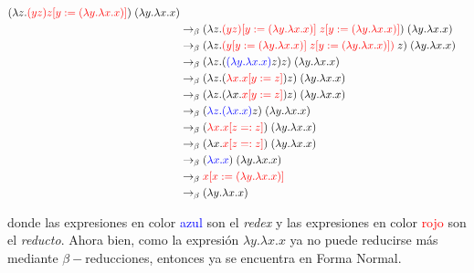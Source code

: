\documentclass[letterpaper,11pt]{article}
\begin{document}
\begin{enumerate}
\begin{enumerate}
\begin{align*}
            (\lambda z. \textcolor{red}{(yz)z [y := (\lambda y. \lambda x.x)]}) 
            \; (\lambda y. \lambda x.x) \\
            &\rightarrow_{\beta}
            (\lambda z. \textcolor{red}{(yz) [y := (\lambda y. \lambda x.x)] \; 
                                         z[y := (\lambda y. \lambda x.x)]}) 
            \; (\lambda y. \lambda x.x) \\
            &\rightarrow_{\beta} 
            (\lambda z. \textcolor{red}{(y [y := (\lambda y. \lambda x.x)] \; 
                                          z [y := (\lambda y. \lambda x.x)])} 
            \; z) \; 
            (\lambda y. \lambda x.x) \\ 
            &\rightarrow_{\beta}
            (\lambda z. (\textcolor{blue}{(\lambda y. \lambda x.x)} z)z) \; 
            (\lambda y. \lambda x.x) \\
            &\rightarrow_{\beta}
            (\lambda z. (\textcolor{red}{\lambda x.x [y := z]}) z) \; 
            (\lambda y. \lambda x.x) \\
            &\rightarrow_{\beta}
            (\lambda z. (\lambda x. \textcolor{red}{x [y := z]}) z) \; 
            (\lambda y. \lambda x.x) \\
            &\rightarrow_{\beta}
            (\textcolor{blue}{\lambda z. (\lambda x. x)} z) \; 
            (\lambda y. \lambda x.x) \\
            &\rightarrow_{\beta}
            (\textcolor{red}{\lambda x.x [z =: z]}) \; 
            (\lambda y. \lambda x.x) \\
            &\rightarrow_{\beta}
            (\lambda x. \textcolor{red}{x [z =: z]}) \; 
            (\lambda y. \lambda x.x) \\
            &\rightarrow_{\beta}
            (\textcolor{blue}{\lambda x. x}) \; 
            (\lambda y. \lambda x.x) \\
            &\rightarrow_{\beta}
            \textcolor{red}{x [x := (\lambda y. \lambda x.x)]} \\
            &\rightarrow_{\beta} (\lambda y. \lambda x.x)
        \end{align*}

        donde las expresiones en color \textcolor{blue}{azul} son el 
        \textit{redex} y las expresiones en color \textcolor{red}{rojo} son el 
        \textit{reducto}. Ahora bien, como la expresión $\lambda y. \lambda x.x$
        ya no puede reducirse más mediante $\beta-$reducciones, entonces ya se 
        encuentra en Forma Normal.
    \end{enumerate}


\end{enumerate}
\end{document}
